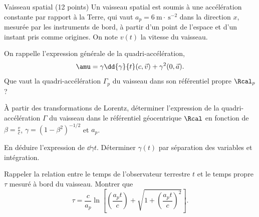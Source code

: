   \begin{exo}[PC][1][devoir]{Vaisseau spatial (12 points)}
Un vaisseau spatial est soumis à une accélération constante par rapport à la Terre, qui vaut $a_p=6 \mathrm{~m} \cdot \mathrm{~s}^{-2}$ dans la direction $x$, mesurée par les instruments de bord, à partir d'un point de l'espace et d'un instant pris comme origines. On note $v(t)$ la vitesse du vaisseau.

\begin{quest}
 \item On rappelle l'expression générale de la quadri-accélération,
 \begin{equation}
  \amu = \gamma \dd{\gamma}{t}(c,\Vec{v}) + \gamma^2 (0,\Vec{a}).
 \end{equation}
 Que vaut la quadri-accélération $\Gamma_p$ du vaisseau dans son référentiel propre $\Rcal_p$ ?

 \item À partir des transformations de Lorentz, déterminer l'expression de la quadri-accélération $\Gamma$ du vaisseau dans le référentiel géocentrique $\Rcal$ en fonction de $\beta=\frac{v}{c}$, $\gamma=(1-\beta^2)^{-1/2}$ et $a_p$.
 \item En déduire l'expression de $\dd{\gamma}{t}$. Déterminer $\gamma(t)$ par séparation des variables et intégration. 
  \item Rappeler la relation entre le temps de l'observateur terrestre $t$ et le temps propre $\tau$ mesuré à bord du vaisseau. Montrer que 
  \begin{equation}
    \tau = \frac{c}{a_p} \ln\left[\left(\frac{a_p t}{c}\right) + \sqrt{1+\left(\frac{a_p t}{c}\right)^2}\right].
  \end{equation}


\end{quest}
\end{exo}
